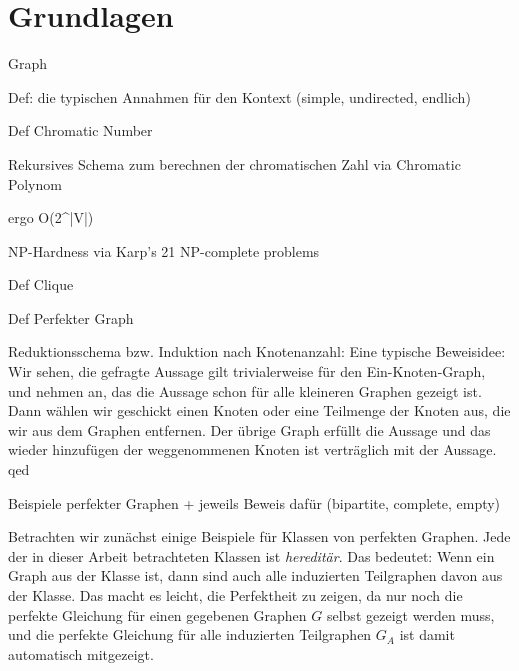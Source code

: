 \documentclass[../main.tex]{subfiles}
\begin{document}
\chapter{Grundlagen}
\label{chapter:basics}

\begin{definition}
    Graph
\end{definition}

Def: die typischen Annahmen für den Kontext (simple, undirected, endlich)

Def Chromatic Number

Rekursives Schema zum berechnen der chromatischen Zahl via Chromatic Polynom

ergo O(2^|V|)

NP-Hardness via Karp's 21 NP-complete problems

Def Clique

Def Perfekter Graph

Reduktionsschema bzw. Induktion nach Knotenanzahl:
    Eine typische Beweisidee: Wir sehen, die gefragte Aussage gilt trivialerweise für den Ein-Knoten-Graph, und nehmen an, das die Aussage schon für alle kleineren Graphen gezeigt ist. Dann wählen wir geschickt einen Knoten oder eine Teilmenge der Knoten aus, die wir aus dem Graphen entfernen. Der übrige Graph erfüllt die Aussage und das wieder hinzufügen der weggenommenen Knoten ist verträglich mit der Aussage. qed

Beispiele perfekter Graphen + jeweils Beweis dafür
    (bipartite, complete, empty)

Betrachten wir zunächst einige Beispiele für Klassen von perfekten Graphen. Jede der in dieser Arbeit betrachteten Klassen ist \emph{hereditär}. Das bedeutet: Wenn ein Graph aus der Klasse ist, dann sind auch alle induzierten Teilgraphen davon aus der Klasse. Das macht es leicht, die Perfektheit zu zeigen, da nur noch die perfekte Gleichung für einen gegebenen Graphen $G$ selbst gezeigt werden muss, und die perfekte Gleichung für alle induzierten Teilgraphen $G_A$ ist damit automatisch mitgezeigt.
\end{document}
